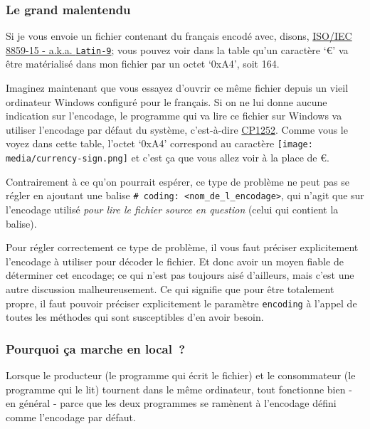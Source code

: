     \hypertarget{le-grand-malentendu}{%
\subsubsection{Le grand malentendu}\label{le-grand-malentendu}}

    Si je vous envoie un fichier contenant du français encodé avec, disons,
\href{http://en.wikipedia.org/wiki/ISO/IEC_8859-15}{ISO/IEC 8859-15 -
a.k.a. \texttt{Latin-9}}; vous pouvez voir dans la table qu'un caractère
`€' va être matérialisé dans mon fichier par un octet `0xA4', soit 164.

Imaginez maintenant que vous essayez d'ouvrir ce même fichier depuis un
vieil ordinateur Windows configuré pour le français. Si on ne lui donne
aucune indication sur l'encodage, le programme qui va lire ce fichier
sur Windows va utiliser l'encodage par défaut du système, c'est-à-dire
\href{http://en.wikipedia.org/wiki/Windows-1252}{CP1252}. Comme vous le
voyez dans cette table, l'octet `0xA4' correspond au caractère
\texttt{[image: media/currency-sign.png]} et c'est ça que vous allez
voir à la place de €.

Contrairement à ce qu'on pourrait espérer, ce type de problème ne peut
pas se régler en ajoutant une balise
\texttt{\#\ coding:\ \textless{}nom\_de\_l\_encodage\textgreater{}}, qui
n'agit que sur l'encodage utilisé \emph{pour lire le fichier source en
question} (celui qui contient la balise).

Pour régler correctement ce type de problème, il vous faut préciser
explicitement l'encodage à utiliser pour décoder le fichier. Et donc
avoir un moyen fiable de déterminer cet encodage; ce qui n'est pas
toujours aisé d'ailleurs, mais c'est une autre discussion
malheureusement. Ce qui signifie que pour être totalement propre, il
faut pouvoir préciser explicitement le paramètre \texttt{encoding} à
l'appel de toutes les méthodes qui sont susceptibles d'en avoir besoin.

    \hypertarget{pourquoi-uxe7a-marche-en-local}{%
\subsubsection{Pourquoi ça marche en
local~?}\label{pourquoi-uxe7a-marche-en-local}}

    Lorsque le producteur (le programme qui écrit le fichier) et le
consommateur (le programme qui le lit) tournent dans le même ordinateur,
tout fonctionne bien - en général - parce que les deux programmes se
ramènent à l'encodage défini comme l'encodage par défaut.

